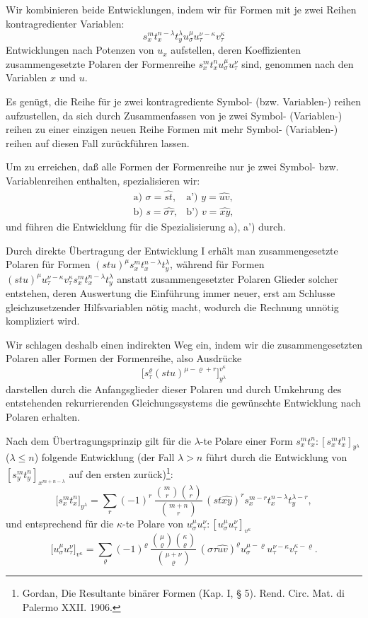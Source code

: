 \documentclass[11pt]{article}
\begin{document}
Wir kombinieren beide Entwicklungen, indem wir für Formen mit je zwei Reihen kontragredienter Variablen:
\[
s_x^m t_x^{n-\lambda}t_y^\lambda u_\sigma^\mu u_\tau^{\nu-\kappa}v_\tau^\kappa
\]
Entwicklungen nach Potenzen von $u_x$ aufstellen, deren Koeffizienten zusammengesetzte Polaren der Formenreihe $s_x^m t_x^n u_\sigma^\mu u_\tau^\nu$ sind, genommen nach den Variablen $x$ und $u$.

Es genügt, die Reihe für je zwei kontragrediente Symbol- (bzw. Variablen-) reihen aufzustellen, da sich durch Zusammenfassen von je zwei Symbol- (Variablen-) reihen zu einer einzigen neuen Reihe Formen mit mehr Symbol- (Variablen-) reihen auf diesen Fall zurückführen lassen.

Um zu erreichen, daß alle Formen der Formenreihe nur je zwei Symbol- bzw. Variablenreihen enthalten, spezialisieren wir:
\[
\begin{array}{ll}
\text{a) } \sigma=\widehat{st}, & \text{a') } y=\widehat{uv},\\[0.3em]
\text{b) } s=\widehat{\sigma\tau}, & \text{b') } v=\widehat{xy},
\end{array}
\]
und führen die Entwicklung für die Spezialisierung a), a') durch.

Durch direkte Übertragung der Entwicklung I erhält man zusammengesetzte Polaren für Formen $(stu)^\mu s_x^m t_x^{n-\lambda}t_y^\lambda$, während für Formen $(stu)^\mu u_\tau^{\nu-\kappa}v_\tau^\kappa s_x^m t_x^{n-\lambda}t_y^\lambda$ anstatt zusammengesetzter Polaren Glieder solcher entstehen, deren Auswertung die Einführung immer neuer, erst am Schlusse gleichzusetzender Hilfsvariablen nötig macht, wodurch die Rechnung unnötig kompliziert wird.

Wir schlagen deshalb einen indirekten Weg ein, indem wir die zusammengesetzten Polaren aller Formen der Formenreihe, also Ausdrücke
\[
\bigl[s_\tau^\varrho(stu)^{\mu-\varrho+r}\bigr]_{y^\lambda}^{v^\kappa}
\]
darstellen durch die Anfangsglieder dieser Polaren und durch Umkehrung des entstehenden rekurrierenden Gleichungssystems die gewünschte Entwicklung nach Polaren erhalten.

Nach dem Übertragungsprinzip gilt für die $\lambda$-te Polare einer Form $s_x^m t_x^n:[s_x^m t_x^n]_{y^\lambda}$ ($\lambda\le n$) folgende Entwicklung (der Fall $\lambda>n$ führt durch die Entwicklung von $[s_y^m t_y^n]_{x^{m+n-\lambda}}$ auf den ersten zurück)\footnote{Gordan, Die Resultante binärer Formen (Kap. I, § 5). Rend. Circ. Mat. di Palermo XXII. 1906.}:
\[
\bigl[s_x^m t_x^n\bigr]_{y^\lambda}
=\sum_r (-1)^r\,
\frac{\binom{m}{r}\binom{\lambda}{r}}{\binom{m+n}{r}}\,
(st\widehat{xy})^r s_x^{m-r}t_x^{n-\lambda}t_y^{\lambda-r},
\]
und entsprechend für die $\kappa$-te Polare von $u_\sigma^\mu u_\tau^\nu:[u_\sigma^\mu u_\tau^\nu]_{v^\kappa}$
\[
\bigl[u_\sigma^\mu u_\tau^\nu\bigr]_{v^\kappa}
=\sum_\varrho (-1)^\varrho\,
\frac{\binom{\mu}{\varrho}\binom{\kappa}{\varrho}}{\binom{\mu+\nu}{\varrho}}\,
(\sigma\tau\widehat{uv})^\varrho u_\sigma^{\mu-\varrho}u_\tau^{\nu-\kappa}v_\tau^{\kappa-\varrho}.
\]
\end{document}
